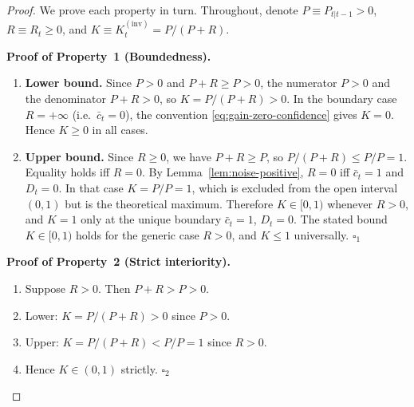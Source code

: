 \documentclass[12pt,openany]{book}
\numberwithin{equation}{chapter}
\theoremstyle{plain}
\theoremstyle{definition}
\theoremstyle{remark}
\begin{document}
\begin{proof}
We prove each property in turn.  Throughout, denote
$P \equiv P_{t|t-1} > 0$, $R \equiv R_t \geq 0$, and
$K \equiv K_t^{(\mathrm{inv})} = P/(P+R)$.

\medskip
\noindent\textbf{Proof of Property~1 (Boundedness).}
\begin{enumerate}
  \item \textbf{Lower bound.}
        Since $P > 0$ and $P + R \geq P > 0$, the
        numerator $P > 0$ and the denominator $P + R > 0$,
        so $K = P/(P+R) > 0$.
        In the boundary case $R = +\infty$
        (i.e.\ $\bar{c}_t = 0$), the convention
        \eqref{eq:gain-zero-confidence} gives $K = 0$.
        Hence $K \geq 0$ in all cases.
  \item \textbf{Upper bound.}
        Since $R \geq 0$, we have $P + R \geq P$,
        so $P/(P+R) \leq P/P = 1$.  Equality holds iff
        $R = 0$.  By Lemma~\ref{lem:noise-positive},
        $R = 0$ iff $\bar{c}_t = 1$ and $D_t = 0$.
        In that case $K = P/P = 1$, which is excluded
        from the open interval $(0,1)$ but is the
        theoretical maximum.
        Therefore $K \in [0, 1)$ whenever $R > 0$, and
        $K = 1$ only at the unique boundary
        $\bar{c}_t = 1$, $D_t = 0$.
        The stated bound $K \in [0,1)$ holds for the
        generic case $R > 0$, and $K \leq 1$ universally.
        $\square_1$
\end{enumerate}

\medskip
\noindent\textbf{Proof of Property~2 (Strict interiority).}
\begin{enumerate}
  \item Suppose $R > 0$.  Then $P + R > P > 0$.
  \item Lower: $K = P/(P+R) > 0$ since $P > 0$.
  \item Upper: $K = P/(P+R) < P/P = 1$ since $R > 0$.
  \item Hence $K \in (0,1)$ strictly. $\square_2$
\end{enumerate}


\end{proof}
\end{document}
